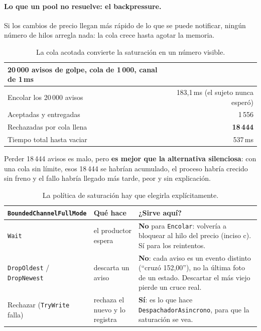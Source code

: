\paragraph{Lo que un pool no resuelve: el backpressure.}
Si los cambios de precio llegan más rápido de lo que se puede notificar, ningún número de
hilos arregla nada: la cola crece hasta agotar la memoria.

\begin{table}[H]
\centering
\small
\begin{tabular}{lr}
\toprule
\textbf{20\,000 avisos de golpe, cola de 1\,000, canal de 1\,ms} & \\
\midrule
Encolar los 20\,000 avisos & 183,1\,ms (el sujeto nunca esperó) \\
Aceptadas y entregadas & 1\,556 \\
Rechazadas por cola llena & \textbf{18\,444} \\
Tiempo total hasta vaciar & 537\,ms \\
\bottomrule
\end{tabular}
\caption{La cola acotada convierte la saturación en un número visible.}
\end{table}

Perder 18\,444 avisos es malo, pero \textbf{es mejor que la alternativa silenciosa}: con una
cola sin límite, esos 18\,444 se habrían acumulado, el proceso habría crecido sin freno y el
fallo habría llegado más tarde, peor y sin explicación.

\begin{table}[H]
\centering
\small
\begin{tabularx}{\textwidth}{>{\raggedright\arraybackslash}p{3.4cm} >{\raggedright\arraybackslash}p{3.8cm} >{\raggedright\arraybackslash}X}
\toprule
\textbf{\texttt{BoundedChannelFullMode}} & \textbf{Qué hace} & \textbf{¿Sirve aquí?} \\
\midrule
\texttt{Wait} & el productor espera & \textbf{No} para \texttt{Encolar}: volvería a bloquear al hilo del precio (inciso c). Sí para los reintentos. \\
\addlinespace
\texttt{DropOldest} / \texttt{DropNewest} & descarta un aviso & \textbf{No}: cada aviso es un evento distinto (``cruzó 152,00''), no la última foto de un estado. Descartar el más viejo pierde un cruce real. \\
\addlinespace
Rechazar (\texttt{TryWrite} falla) & rechaza el nuevo y lo registra & \textbf{Sí}: es lo que hace \texttt{DespachadorAsincrono}, para que la saturación se vea. \\
\bottomrule
\end{tabularx}
\caption{La política de saturación hay que elegirla explícitamente.}
\end{table}

